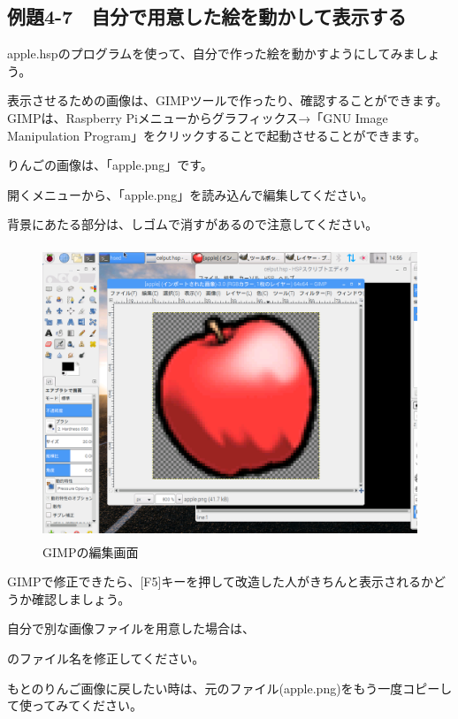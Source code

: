 \newpage
\subsection{例題4-7　自分で用意した絵を動かして表示する}


\begin{description}
    \item {}
\end{description}



apple.hspのプログラムを使って、自分で作った絵を動かすようにしてみましょう。

表示させるための画像は、GIMPツールで作ったり、確認することができます。GIMPは、Raspberry
Piメニューからグラフィックス→「GNU Image Manipulation Program」をクリックすることで起動させることができます。

りんごの画像は、「apple.png」です。

開くメニューから、「apple.png」を読み込んで編集してください。

背景にあたる部分は、しゴムで消すがあるので注意してください。


\begin{figure}[H]
    \begin{center}
      \includegraphics[keepaspectratio,width=11.712cm,height=8.784cm]{text04-img/text04-img021.png}
      \caption{GIMPの編集画面}
    \end{center}
    \label{fig:prog_menu}
\end{figure}

\begin{description}
    \item {}
\end{description}



GIMPで修正できたら、[F5]キーを押して改造した人がきちんと表示されるかどうか確認しましょう。

自分で別な画像ファイルを用意した場合は、

\begin{description}
    \item {}
\end{description}


のファイル名を修正してください。

もとのりんご画像に戻したい時は、元のファイル(apple.png)をもう一度コピーして使ってみてください。





